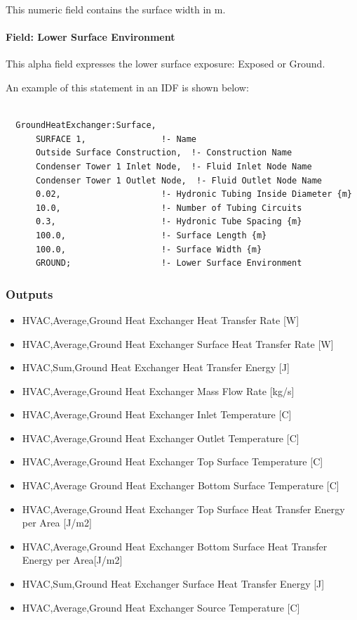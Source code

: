 This numeric field contains the surface width in m.

\paragraph{Field: Lower Surface Environment}\label{field-lower-surface-environment}

This alpha field expresses the lower surface exposure: Exposed or Ground.

An example of this statement in an IDF is shown below:

\begin{lstlisting}

  GroundHeatExchanger:Surface,
      SURFACE 1,               !- Name
      Outside Surface Construction,  !- Construction Name
      Condenser Tower 1 Inlet Node,  !- Fluid Inlet Node Name
      Condenser Tower 1 Outlet Node,  !- Fluid Outlet Node Name
      0.02,                    !- Hydronic Tubing Inside Diameter {m}
      10.0,                    !- Number of Tubing Circuits
      0.3,                     !- Hydronic Tube Spacing {m}
      100.0,                   !- Surface Length {m}
      100.0,                   !- Surface Width {m}
      GROUND;                  !- Lower Surface Environment
\end{lstlisting}

\subsubsection{Outputs}\label{outputs-13-000}

\begin{itemize}
\item
  HVAC,Average,Ground Heat Exchanger Heat Transfer Rate {[}W{]}
\item
  HVAC,Average,Ground Heat Exchanger Surface Heat Transfer Rate {[}W{]}
\item
  HVAC,Sum,Ground Heat Exchanger Heat Transfer Energy {[}J{]}
\item
  HVAC,Average,Ground Heat Exchanger Mass Flow Rate {[}kg/s{]}
\item
  HVAC,Average,Ground Heat Exchanger Inlet Temperature {[}C{]}
\item
  HVAC,Average,Ground Heat Exchanger Outlet Temperature {[}C{]}
\item
  HVAC,Average,Ground Heat Exchanger Top Surface Temperature {[}C{]}
\item
  HVAC,Average Ground Heat Exchanger Bottom Surface Temperature {[}C{]}
\item
  HVAC,Average,Ground Heat Exchanger Top Surface Heat Transfer Energy per Area {[}J/m2{]}
\item
  HVAC,Average,Ground Heat Exchanger Bottom Surface Heat Transfer Energy per Area{[}J/m2{]}
\item
  HVAC,Sum,Ground Heat Exchanger Surface Heat Transfer Energy {[}J{]}
\item
  HVAC,Average,Ground Heat Exchanger Source Temperature {[}C{]}
\end{itemize}

